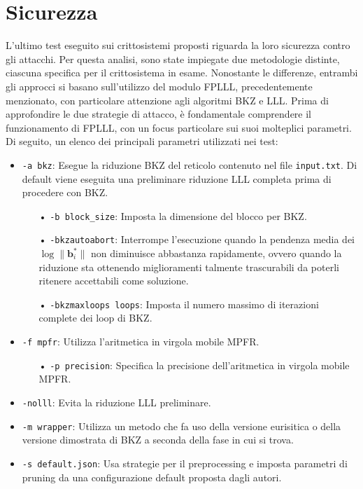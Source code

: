 \section{Sicurezza}
\label{sec:risultati_sicurezza}
L'ultimo test eseguito sui crittosistemi proposti riguarda la loro sicurezza contro gli 
attacchi. Per questa analisi, sono state impiegate due metodologie distinte, 
ciascuna specifica per il crittosistema in esame. Nonostante le differenze, entrambi 
gli approcci si basano sull'utilizzo del modulo FPLLL, precedentemente menzionato, 
con particolare attenzione agli algoritmi BKZ e LLL. 
Prima di approfondire le due strategie di attacco, è fondamentale comprendere il 
funzionamento di FPLLL, con un focus particolare sui suoi molteplici parametri. 
Di seguito, un elenco dei principali parametri utilizzati nei test:
\begin{itemize}
    \item \texttt{-a bkz}: Esegue la riduzione BKZ del reticolo contenuto nel file 
    \texttt{input.txt}. Di default viene eseguita una preliminare riduzione LLL completa 
    prima di procedere con BKZ. 
    \begin{itemize}
        \item[•] \texttt{-b block\_size}: Imposta la dimensione del blocco per BKZ.
        \item[•] \texttt{-bkzautoabort}: Interrompe l'esecuzione quando la pendenza media dei 
        $\log \|\mathbf{b}_i^*\|$ non diminuisce abbastanza rapidamente, ovvero quando la 
        riduzione sta ottenendo miglioramenti talmente trascurabili da poterli ritenere
        accettabili come soluzione. 
        \item[•] \texttt{-bkzmaxloops loops}: Imposta il numero massimo di iterazioni 
        complete dei loop di BKZ.
    \end{itemize}
    \item \texttt{-f mpfr}: Utilizza l'aritmetica in virgola mobile MPFR.
    \begin{itemize}
        \item[•] \texttt{-p precision}: Specifica la precisione dell'aritmetica in 
        virgola mobile MPFR.
    \end{itemize}
    \item \texttt{-nolll}: Evita la riduzione LLL preliminare.
    \item \texttt{-m wrapper}: Utilizza un metodo che fa uso della versione eurisitica o 
    della versione dimostrata di BKZ a seconda della fase in cui si trova. 
    \item \texttt{-s default.json}: Usa strategie per il preprocessing e imposta 
    parametri di pruning da una configurazione default proposta dagli autori. 
\end{itemize}
